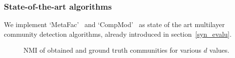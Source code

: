 \subsubsection{State-of-the-art algorithms} We implement `MetaFac'~\cite{metafac} and `CompMod'~\cite{CompMod} as state of the art multilayer community
detection algorithms, already introduced in section~\ref{syn_evalu}.

\begin{figure}
\begin{center}
\end{center}
\vspace{-0.24in}
\caption{NMI of obtained and ground truth communities for various $d$ values.}
\vspace{-0.22in}
\label{nmi00}
\end{figure}



